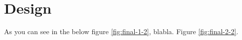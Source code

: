 \section{Design}

As you can see in the below figure \ref{fig:final-1-2}, blabla. Figure
\ref{fig:final-2-2}.




